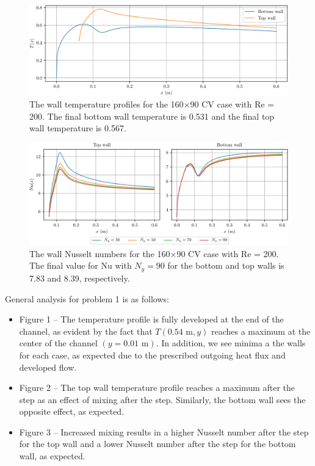 \documentclass{article}
\begin{document}
\begin{figure}[H]
	\centering
	\includegraphics[width=0.9\linewidth]{../results/1b_Twall}
	\caption{The wall temperature profiles for the 160$\times$90 CV case with Re = 200. The final bottom wall temperature is 0.531 and the final top wall temperature is 0.567.}
	\label{fig:1b_Twall}
\end{figure}

\begin{figure}[H]
	\centering
	\includegraphics[width=0.9\linewidth]{../results/1c_Nu}
	\caption{The wall Nusselt numbers for the 160$\times$90 CV case with Re = 200. The final value for Nu with $N_y = 90$ for the bottom and top walls is 7.83 and 8.39, respectively.}
	\label{fig:1c_Nu}
\end{figure}

General analysis for problem 1 is as follows:
\begin{itemize}
	\item Figure 1 -- The temperature profile is fully developed at the end of the channel, as evident by the fact that $T(0.54\text{~m}, y)$ reaches a maximum at the center of the channel $(y = 0.01\text{~m})$. In addition, we see minima a the walls for each case, as expected due to the prescribed outgoing heat flux and developed flow.
	\item Figure 2 -- The top wall temperature profile reaches a maximum after the step as an effect of mixing after the step. Similarly, the bottom wall sees the opposite effect, as expected.
	\item Figure 3 -- Increased mixing results in a higher Nusselt number after the step for the top wall and a lower Nusselt number after the step for the bottom wall, as expected.
\end{itemize}
\end{document}

